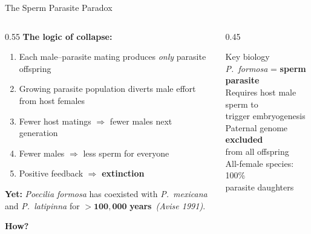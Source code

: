 \documentclass{beamer}
\begin{document}
\begin{frame}{The Sperm Parasite Paradox}

  \begin{columns}[T]
    \begin{column}{0.55\textwidth}
      \textbf{The logic of collapse:}
      \begin{enumerate}
        \item Each male--parasite mating produces \emph{only} parasite offspring
        \item Growing parasite population diverts male effort from host females
        \item Fewer host matings $\Rightarrow$ fewer males next generation
        \item Fewer males $\Rightarrow$ less sperm for everyone
        \item Positive feedback $\Rightarrow$ \textbf{extinction}
      \end{enumerate}

      \vspace{0.4cm}
      \textbf{Yet:} \textit{Poecilia formosa} has coexisted with
      \textit{P.~mexicana} and \textit{P.~latipinna} for
      $\mathbf{> 100{,}000}$ \textbf{years}~\textit{(Avise 1991)}.

      \vspace{0.3cm}
      \textcolor{alertred}{\textbf{How?}}
    \end{column}

    \begin{column}{0.45\textwidth}
      \vspace{0.2cm}
      \begin{block}{Key biology}
        \textit{P.~formosa} = \textbf{sperm parasite}\\[4pt]
        Requires host male sperm to\\
        trigger embryogenesis\\[4pt]
        Paternal genome \textbf{excluded}\\
        from all offspring\\[4pt]
        All-female species: 100\%\\
        parasite daughters
      \end{block}
    \end{column}
  \end{columns}

\end{frame}
\end{document}
